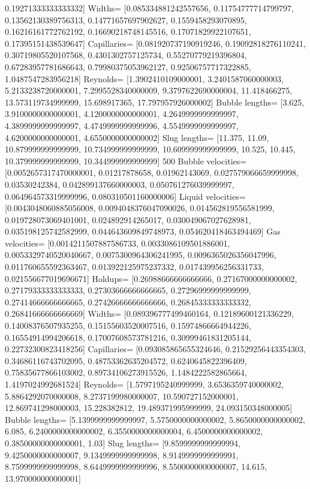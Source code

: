 \documentclass{article}
\begin{document}
0.19271333333333332]
Widths= [0.085334881242557656, 0.11754777714799797, 0.13562130389756313, 0.14771657697902627,
0.1559458293070895, 0.16216161772762192, 0.16690218748145516, 0.17071829922107651,
0.17395151438539647]
Capillaries= [0.081920737190919246, 0.19092818276110241, 0.30719805520107568, 0.4301302757125734,
0.55270779219396804, 0.67283957781686643, 0.79980375053962127, 0.92506757717322885,
1.0487547283956218]
Reynolds= [1.3902410109000001, 3.2401587060000003, 5.2133238720000001, 7.2995528340000009,
9.3797622690000004, 11.418466275, 13.573119734999999, 15.698917365, 17.797957926000002]
Bubble lengths= [3.625, 3.9100000000000001, 4.1200000000000001, 4.2649999999999997,
4.3899999999999997, 4.4749999999999996, 4.5549999999999997, 4.6200000000000001, 4.6550000000000002]
Slug lengths= [11.375, 11.09, 10.879999999999999, 10.734999999999999, 10.609999999999999, 10.525,
10.445, 10.379999999999999, 10.344999999999999]
500
Bubble velocities= [0.0052657317470000001, 0.01217878658, 0.01962143069, 0.027579066659999998,
0.03530242384, 0.042899137660000003, 0.050761276039999997, 0.064964573319999996,
0.080310501160000006]
Liquid velocities= [0.0043048060885056008, 0.0094048376047090026, 0.014562819556581999,
0.019728073069401001, 0.024892914265017, 0.030049067027628981, 0.035198125742582999,
0.044643609849748973, 0.054620418463494469]
Gas velocities= [0.0014211507887586733, 0.0033086109501886001, 0.0053329740520040667,
0.0075300964306241995, 0.0096365026356047996, 0.011760655592363467, 0.013922125975237332,
0.017439956256331733, 0.021556677019696671]
Holdups= [0.26988666666666666, 0.27167000000000002, 0.27179333333333333, 0.27303666666666665,
0.27296999999999999, 0.27414666666666665, 0.27426666666666666, 0.26845333333333332,
0.26841666666666669]
Widths= [0.089396777499460164, 0.12189600121336229, 0.14008376507935255, 0.15155603520007516,
0.15974866664944226, 0.16554914994206618, 0.17007608573781216, 0.30999461831205144,
0.22732300823418256]
Capillaries= [0.093085865655324646, 0.21529256443354303, 0.34686116743702095, 0.48753362635204572,
0.6240645822396409, 0.75835677866103002, 0.89734106273915526, 1.1484222582865664,
1.4197024992681524]
Reynolds= [1.5797195240999999, 3.6536359740000002, 5.8864292070000008, 8.2737199980000007,
10.590727152000001, 12.869741298000003, 15.228382812, 19.489371995999999, 24.093150348000005]
Bubble lengths= [5.1399999999999997, 5.5750000000000002, 5.8650000000000002, 6.085,
6.2400000000000002, 6.3550000000000004, 6.4500000000000002, 0.38500000000000001, 1.03]
Slug lengths= [9.8599999999999994, 9.4250000000000007, 9.1349999999999998, 8.9149999999999991,
8.7599999999999998, 8.6449999999999996, 8.5500000000000007, 14.615, 13.970000000000001]
\end{document}
